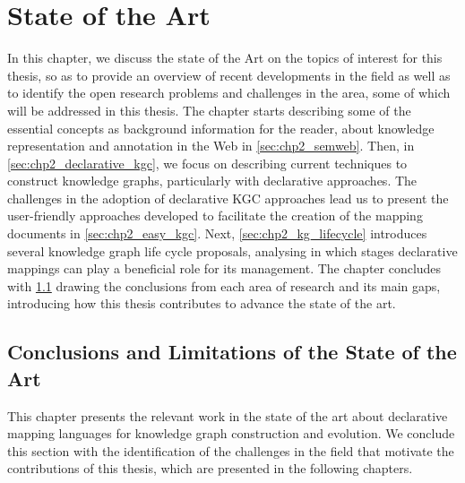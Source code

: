 \chapter{State of the Art}
\label{chapter:sota}

In this chapter, we discuss the state of the Art on the topics of interest for this thesis, so as to provide an overview of recent developments in the field as well as to identify the open research problems and challenges in the area, some of which will be addressed in this thesis. 
The chapter starts describing some of the essential concepts as background information for the reader, about knowledge representation and annotation in the Web in \cref{sec:chp2_semweb}. 
Then, in \cref{sec:chp2_declarative_kgc}, we focus on describing current techniques to construct knowledge graphs, particularly with declarative approaches. 
The challenges in the adoption of declarative KGC approaches lead us to present the user-friendly approaches developed to facilitate the creation of the mapping documents in \cref{sec:chp2_easy_kgc}. Next, \cref{sec:chp2_kg_lifecycle} introduces several knowledge graph life cycle proposals, analysing in which stages declarative mappings can play a beneficial role for its management. 
The chapter concludes with \cref{sec:chp2_conclusions-sota} drawing the conclusions from each area of research and its main gaps, introducing how this thesis contributes to advance the state of the art. 










\section{Conclusions and Limitations of the State of the Art}
\label{sec:chp2_conclusions-sota}

This chapter presents the relevant work in the state of the art about declarative mapping languages for knowledge graph construction and evolution. 
We conclude this section with the identification of the challenges in the field that motivate the contributions of this thesis, which are presented in the following chapters.

